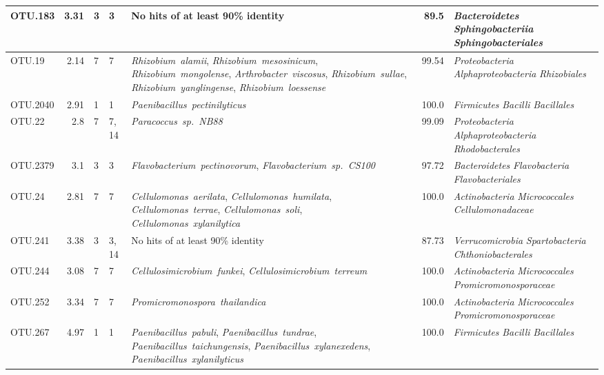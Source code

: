 \begin{ThreePartTable}
\begin{longtable}{P{1.5cm}rP{1cm}P{1.5cm}P{4cm}rP{5cm}}
OTU.183 & 3.31 & 3 & 3&{No hits of at least 90\% identity} & 89.5 & \mbox{\textit{Bacteroidetes}} \mbox{\textit{Sphingobacteriia}} \mbox{\textit{Sphingobacteriales}} \\ \midrule
OTU.19 & 2.14 & 7 & 7&\mbox{\textit{Rhizobium alamii}}, \mbox{\textit{Rhizobium mesosinicum}}, \mbox{\textit{Rhizobium mongolense}}, \mbox{\textit{Arthrobacter viscosus}}, \mbox{\textit{Rhizobium sullae}}, \mbox{\textit{Rhizobium yanglingense}}, \mbox{\textit{Rhizobium loessense}} & 99.54 & \mbox{\textit{Proteobacteria}} \mbox{\textit{Alphaproteobacteria}} \mbox{\textit{Rhizobiales}} \\ \midrule
OTU.2040 & 2.91 & 1 & 1&\mbox{\textit{Paenibacillus pectinilyticus}} & 100.0 & \mbox{\textit{Firmicutes}} \mbox{\textit{Bacilli}} \mbox{\textit{Bacillales}} \\ \midrule
OTU.22 & 2.8 & 7 & 7, 14&\mbox{\textit{Paracoccus sp. NB88}} & 99.09 & \mbox{\textit{Proteobacteria}} \mbox{\textit{Alphaproteobacteria}} \mbox{\textit{Rhodobacterales}} \\ \midrule
OTU.2379 & 3.1 & 3 & 3&\mbox{\textit{Flavobacterium pectinovorum}}, \mbox{\textit{Flavobacterium sp. CS100}} & 97.72 & \mbox{\textit{Bacteroidetes}} \mbox{\textit{Flavobacteria}} \mbox{\textit{Flavobacteriales}} \\ \midrule
OTU.24 & 2.81 & 7 & 7&\mbox{\textit{Cellulomonas aerilata}}, \mbox{\textit{Cellulomonas humilata}}, \mbox{\textit{Cellulomonas terrae}}, \mbox{\textit{Cellulomonas soli}}, \mbox{\textit{Cellulomonas xylanilytica}} & 100.0 & \mbox{\textit{Actinobacteria}} \mbox{\textit{Micrococcales}} \mbox{\textit{Cellulomonadaceae}} \\ \midrule
OTU.241 & 3.38 & 3 & 3, 14&{No hits of at least 90\% identity} & 87.73 & \mbox{\textit{Verrucomicrobia}} \mbox{\textit{Spartobacteria}} \mbox{\textit{Chthoniobacterales}} \\ \midrule
OTU.244 & 3.08 & 7 & 7&\mbox{\textit{Cellulosimicrobium funkei}}, \mbox{\textit{Cellulosimicrobium terreum}} & 100.0 & \mbox{\textit{Actinobacteria}} \mbox{\textit{Micrococcales}} \mbox{\textit{Promicromonosporaceae}} \\ \midrule
OTU.252 & 3.34 & 7 & 7&\mbox{\textit{Promicromonospora thailandica}} & 100.0 & \mbox{\textit{Actinobacteria}} \mbox{\textit{Micrococcales}} \mbox{\textit{Promicromonosporaceae}} \\ \midrule
OTU.267 & 4.97 & 1 & 1&\mbox{\textit{Paenibacillus pabuli}}, \mbox{\textit{Paenibacillus tundrae}}, \mbox{\textit{Paenibacillus taichungensis}}, \mbox{\textit{Paenibacillus xylanexedens}}, \mbox{\textit{Paenibacillus xylanilyticus}} & 100.0 & \mbox{\textit{Firmicutes}} \mbox{\textit{Bacilli}} \mbox{\textit{Bacillales}} \\ \midrule

\end{longtable}
\end{ThreePartTable}
